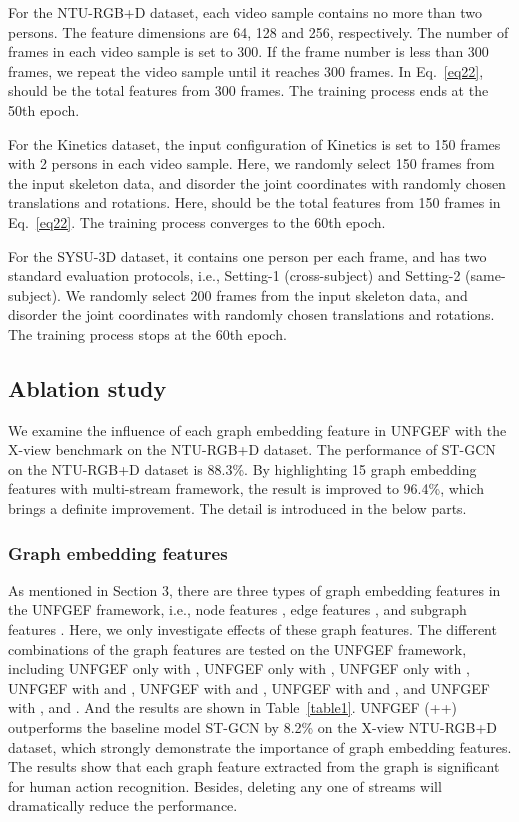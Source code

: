 \documentclass[journal]{IEEEtran}
\begin{document}
For the NTU-RGB+D dataset, each video sample contains no more than two persons. The feature dimensions are 64, 128 and 256, respectively. The number of frames in each video sample is set to 300. If the frame number is less than 300 frames, we repeat the video sample until it reaches 300 frames. In Eq.~\ref{eq22},  should be the total features from 300 frames. The training process ends at the 50th epoch.

For the Kinetics dataset, the input configuration of Kinetics is set to 150 frames with 2 persons in each video sample. Here, we randomly select 150 frames from the input skeleton data, and disorder the joint coordinates with randomly chosen translations and rotations. Here,  should be the total features from 150 frames in Eq.~\ref{eq22}. The training process converges to the 60th epoch.

For the SYSU-3D dataset, it contains one person per each frame, and has two standard evaluation protocols, i.e., Setting-1 (cross-subject) and Setting-2 (same-subject). We randomly select 200 frames from the input skeleton data, and disorder the joint coordinates with randomly chosen translations and rotations. The training process stops at the 60th epoch.

\subsection{Ablation study}

We examine the influence of each graph embedding feature in UNFGEF with the X-view benchmark on the NTU-RGB+D dataset. The performance of ST-GCN on the NTU-RGB+D dataset is 88.3\%. By highlighting 15 graph embedding features with multi-stream framework, the result is improved to 96.4\%, which brings a definite improvement. The detail is introduced in the below parts.

\subsubsection{Graph embedding features}

As mentioned in Section 3, there are three types of graph embedding features in the UNFGEF framework, i.e., node features , edge features , and subgraph features . Here, we only investigate effects of these graph features. The different combinations of the graph features are tested on the UNFGEF framework, including UNFGEF only with , UNFGEF only with , UNFGEF only with , UNFGEF with  and , UNFGEF with  and , UNFGEF with  and , and UNFGEF with ,  and . And the results are shown in Table~\ref{table1}. UNFGEF (++) outperforms the baseline model ST-GCN by 8.2\% on the X-view NTU-RGB+D dataset, which strongly demonstrate the importance of graph embedding features. The results show that each graph feature extracted from the graph is significant for human action recognition. Besides, deleting any one of streams will dramatically reduce the performance.
\end{document}

